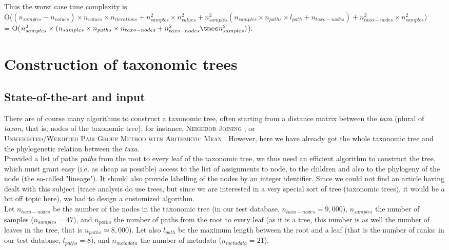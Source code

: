 \documentclass{report}
\begin{document}
Thus the worst case time complexity is\\
O($(n_{samples} - n_{values}) \times n_{values} \times n_{iterations} + n_{samples}^{2} \times n_{values}^{2} + n_{samples}^{2} (n_{samples} \times n_{paths} \times l_{path} + n_{taxo-nodes}) + n_{taxo-nodes}^{2} \times n_{samples}^{2}$)\\
= O($n_{samples}^{2} \times (n_{samples} \times n_{paths} \times n_{taxo-nodes} + n_{taxo-nodes}^{2} \tmes n_{samples}^{2})$).

\chapter{Construction of taxonomic trees}

\section{State-of-the-art and input}

There are of course many algorithms to construct a taxonomic tree, often starting from a distance matrix between the \emph{taxa} (plural of \emph{taxon}, that is, nodes of the taxonomic tree); for instance, \textsc{Neighbor \-Joining} \cite{NeighborJoining}, or \\ \textsc{Unweighted/Weighted\- Pair \-Group\- Method\- with \-Arithmetic\- Mean\-} \cite{UMPGA}. However, here we have already got the whole taxonomic tree and the phylogenetic relation between the \emph{taxa}.\\

Provided a list of paths \emph{paths} from the root to every leaf of the taxonomic tree, we thus need an efficient algorithm to construct the tree, which must grant easy (i.e. as cheap as possible) access to the list of assignments to node, to the children and also to the phylogeny of the node (the so-called "lineage"). It should also provide labelling of the nodes by an integer identifier. Since we could not find an article having dealt with this subject (trace analysis do use trees, but since we are interested in a very special sort of tree (taxonomic trees), it would be a bit off topic here), we had to design a customized algorithm.\\

Let $n_{taxo-nodes}$ be the number of the nodes in the taxonomic tree (in our test database, $n_{taxo-nodes} = 9,000$), $n_{samples}$ the number of samples ($n_{samples} = 47$), and $n_{paths}$ the number of paths from the root to every leaf (as it is a tree, this number is as well the number of leaves in the tree, that is $n_{paths} \simeq 8,000$). Let also $l_{path}$ be the maximum length between the root and a leaf (that is the number of ranks: in our test database, $l_{paths} = 8$), and $n_{metadata}$ the number of metadata ($n_{metadata} = 21$).\\
\end{document}
